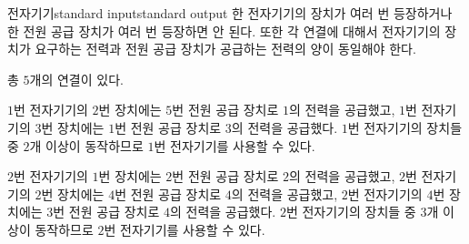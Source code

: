 \begin{problem}{전자기기}{standard input}{standard output}
한 전자기기의 장치가 여러 번 등장하거나 한 전원 공급 장치가 여러 번 등장하면 안 된다. 또한 각 연결에 대해서 전자기기의 장치가 요구하는 전력과 전원 공급 장치가 공급하는 전력의 양이 동일해야 한다.

\Example

\begin{example}
%
\end{example}

\Notes

총 $5$개의 연결이 있다.

$1$번 전자기기의 $2$번 장치에는 $5$번 전원 공급 장치로 $1$의 전력을 공급했고, $1$번 전자기기의 $3$번 장치에는 $1$번 전원 공급 장치로 $3$의 전력을 공급했다. $1$번 전자기기의 장치들 중 $2$개 이상이 동작하므로 $1$번 전자기기를 사용할 수 있다.

$2$번 전자기기의 $1$번 장치에는 $2$번 전원 공급 장치로 $2$의 전력을 공급했고, $2$번 전자기기의 $2$번 장치에는 $4$번 전원 공급 장치로 $4$의 전력을 공급했고, $2$번 전자기기의 $4$번 장치에는 $3$번 전원 공급 장치로 $4$의 전력을 공급했다. $2$번 전자기기의 장치들 중 $3$개 이상이 동작하므로 $2$번 전자기기를 사용할 수 있다.

\end{problem}
